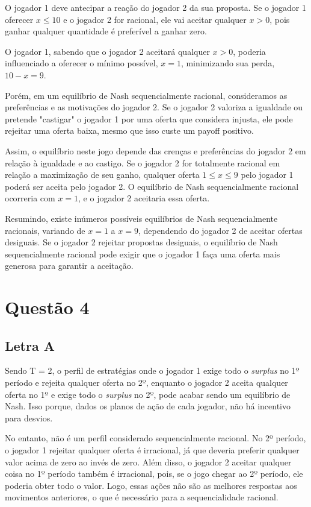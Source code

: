 \documentclass[a4paper,12pt]{article}[abntex2]
\begin{document}
O jogador 1 deve antecipar a reação do jogador 2 da sua proposta. Se o jogador 1 oferecer \( x \leq 10 \) e o jogador 2 for racional, ele vai aceitar qualquer \( x > 0 \), pois ganhar qualquer quantidade é preferível a ganhar zero.

O jogador 1, sabendo que o jogador 2 aceitará qualquer \( x > 0 \), poderia influenciado a oferecer o mínimo possível, \( x = 1 \), minimizando sua perda, \( 10 - x = 9 \).

Porém, em um equilíbrio de Nash sequencialmente racional,  consideramos as preferências e as motivações do jogador 2. Se o jogador 2 valoriza a igualdade ou pretende "castigar" o jogador 1 por uma oferta que considera injusta, ele pode rejeitar uma oferta baixa, mesmo que isso custe um payoff positivo.

Assim, o equilíbrio neste jogo depende das crenças e preferências do jogador 2 em relação à igualdade e ao castigo. Se o jogador 2 for totalmente racional em relação a maximização de seu ganho, qualquer oferta \( 1 \leq x \leq 9 \) pelo jogador 1 poderá ser aceita pelo jogador 2. O equilíbrio de Nash sequencialmente racional ocorreria com \( x = 1 \), e o jogador 2 aceitaria essa oferta.

Resumindo, existe inúmeros possíveis equilíbrios de Nash sequencialmente racionais, variando de \( x = 1 \) a \( x = 9 \), dependendo do jogador 2 de aceitar ofertas desiguais. Se o jogador 2 rejeitar propostas desiguais, o equilíbrio de Nash sequencialmente racional pode exigir que o jogador 1 faça uma oferta mais generosa para garantir a aceitação.

\section{\textbf{Questão 4}}

\subsection{\textbf{Letra A}}
 Sendo T = 2, o perfil de estratégias onde o jogador 1 exige todo o \textit{surplus} no 1º período e rejeita qualquer oferta no 2º, enquanto o jogador 2 aceita qualquer oferta no 1º e exige todo o \textit{surplus} no 2º, pode acabar sendo um equilíbrio de Nash. Isso porque, dados os planos de ação de cada jogador, não há incentivo para desvios.

No entanto, não é um perfil considerado sequencialmente racional. No 2º período, o jogador 1 rejeitar qualquer oferta é irracional, já que deveria preferir qualquer valor acima de zero ao invés de zero. Além disso, o jogador 2 aceitar qualquer coisa no 1º período também é irracional, pois, se o jogo chegar ao 2º período, ele poderia obter todo o valor. Logo, essas ações não são as melhores respostas aos movimentos anteriores, o que é necessário para a sequencialidade racional.
\end{document}
